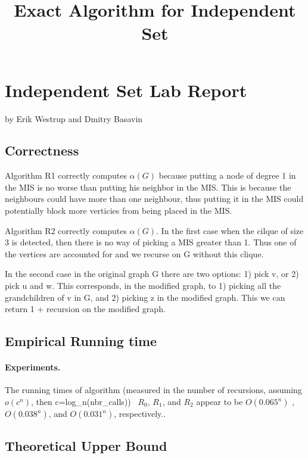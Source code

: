 \documentclass{tufte-handout}
\title{\sf Exact Algorithm for Independent Set}
\author{}
\begin{document}
\maketitle

\section{Independent Set Lab Report}
by Erik Westrup and Dmitry Basavin

\subsection{Correctness}
Algorithm R1 correctly computes $\alpha(G)$ because putting a node of degree 1 in the MIS is no worse than putting his neighbor in the MIS. This is because the neighbours could have more than one neighbour, thus putting it in the MIS could potentially block more verticies from being placed in the MIS. %

\noindent
Algorithm R2 correctly computes $\alpha(G)$. In the first case when the cilque of size 3 is detected, then there is no way of picking a MIS greater than 1. Thus one of the vertices are accounted for and we recurse on G without this clique.

In the second case in the original graph G there are two options: 1) pick v, or 2) pick u and w. This corresponds, in the modified graph, to 1) picking all the grandchildren of v in G, and  2) picking z in the modified graph. This we can return 1 + recursion on the modified graph.

\subsection{Empirical Running time}

\paragraph{Experiments.}

\medskip
\noindent

    

The running times of algorithm (measured in the number of recursions, assuming $o(c^n)$, then c=log\_n(nbr\_calls)) ~$R_0$, $R_1$, and $R_2$ appear to be
$O(0.065^n)$ , $O(0.038^n)$, and $O(0.031^n)$, respectively..

\subsection{Theoretical Upper Bound}
\end{document}
